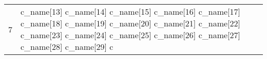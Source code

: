\begin{longtable}{| p{0.5cm} | p{3cm} | p{8.5cm} | p{4cm} |}
7 & c\_name[13] \newline c\_name[14] \newline c\_name[15] \newline c\_name[16] \newline c\_name[17] \newline c\_name[18] \newline c\_name[19] \newline c\_name[20] \newline c\_name[21] \newline c\_name[22] \newline c\_name[23] \newline c\_name[24] \newline c\_name[25] \newline c\_name[26] \newline c\_name[27] c\_name[28] \newline  c\_name[29] \newline c\
\end{longtable}
